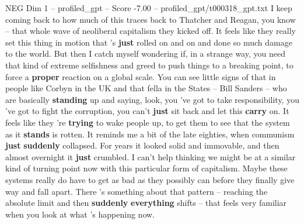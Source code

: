 \begin{textsample}{NEG Dim 1 – profiled\_gpt – Score -7.00 – profiled\_gpt/t000318\_gpt.txt}  \label{ex:f1_neg_019}
I keep coming back to how much of this traces back to Thatcher and Reagan, you know – that whole wave of neoliberal capitalism they kicked off.
It feels like they really set this thing in motion that ’s \textbf{just} rolled on and on and done so much damage to the world.
But then I catch myself wondering if, in a strange way, you need that kind of extreme selfishness and greed to push things to a breaking point, to force a \textbf{proper} reaction on a global scale.
You can see little signs of that in people like Corbyn in the UK and that fella in the States – Bill Sanders – who are basically \textbf{standing} up and saying, look, you ’ve got to take responsibility, you ’ve got to fight the corruption, you can't \textbf{just} sit back and let this \textbf{carry} on.
It feels like they ’re \textbf{trying} to wake people up, to get them to see that the system as it \textbf{stands} is rotten.
It reminds me a bit of the late eighties, when communism \textbf{just} \textbf{suddenly} collapsed.
For years it looked solid and immovable, and then almost overnight it \textbf{just} crumbled.
I can't help thinking we might be at a similar kind of turning point now with this particular form of capitalism.
Maybe these systems really do have to get as bad as they possibly can before they finally give way and fall apart.
There ’s something about that pattern – reaching the absolute limit and then \textbf{suddenly} \textbf{everything} shifts – that feels very familiar when you look at what ’s happening now.

\end{textsample}
